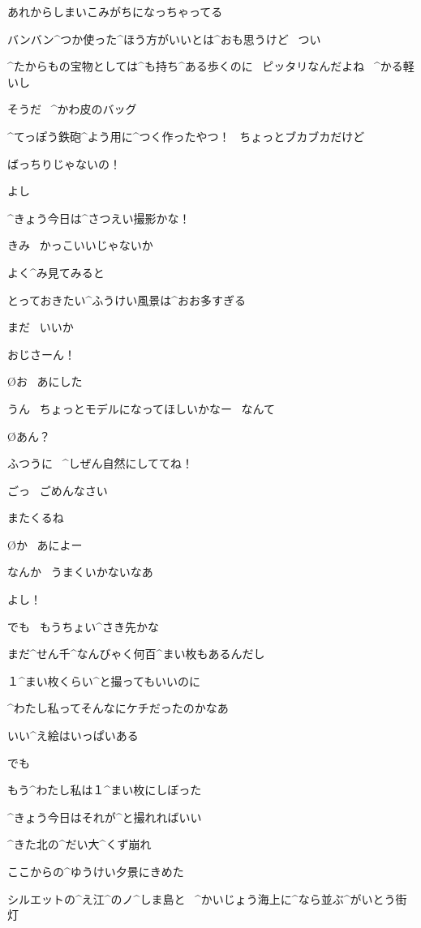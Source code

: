 \A あれからしまいこみがちになっちゃってる

\A バンバン^{つか}{使}った^{ほう}{方}がいいとは^{おも}{思}うけど
\ つい

\A ^{たからもの}{宝物}としては^{も}{持}ち^{ある}{歩}くのに
\ ピッタリなんだよね
\ ^{かる}{軽}いし

\page
\A そうだ
\ ^{かわ}{皮}のバッグ

\A ^{てっぽう}{鉄砲}^{よう}{用}に^{つく}{作}ったやつ！
\ ちょっとブカブカだけど

\A ばっちりじゃないの！

\A よし

\A ^{きょう}{今日}は^{さつえい}{撮影}かな！

\page
\A きみ
\ かっこいいじゃないか

\page
\A よく^{み}{見}てみると

\A とっておきたい^{ふうけい}{風景}は^{おお}{多}すぎる

\A まだ
\ いいか

\page
\A おじさーん！

\O お
\ あにした

\A うん
\ ちょっとモデルになってほしいかなー
\ なんて

\O あん？

\A ふつうに
\ ^{しぜん}{自然}にしててね！

\page
\A ごっ
\ ごめんなさい

\A またくるね

\O か
\ あによー

\A なんか
\ うまくいかないなあ

\page
\A よし！

\A でも
\ もうちょい^{さき}{先}かな

\page
\A まだ^{せん}{千}^{なんびゃく}{何百}^{まい}{枚}もあるんだし

\A １^{まい}{枚}くらい^{と}{撮}ってもいいのに

\A ^{わたし}{私}ってそんなにケチだったのかなあ

\page
\A いい^{え}{絵}はいっぱいある

\A でも

\A もう^{わたし}{私}は１^{まい}{枚}にしぼった

\A ^{きょう}{今日}はそれが^{と}{撮}れればいい

\page
\A ^{きた}{北}の^{だい}{大}^{くず}{崩}れ

\A ここからの^{ゆうけい}{夕景}にきめた

\A シルエットの^{え}{江}^{の}{ノ}^{しま}{島}と
\ ^{かいじょう}{海上}に^{なら}{並}ぶ^{がいとう}{街灯}

